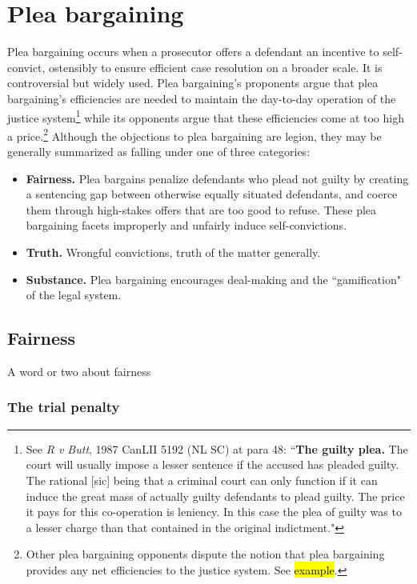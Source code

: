 \section{Plea bargaining}

Plea bargaining occurs when a prosecutor offers a defendant an incentive to self-convict, ostensibly to ensure efficient case resolution on a broader scale. It is controversial but widely used. Plea bargaining's proponents argue that plea bargaining's efficiencies are needed to maintain the day-to-day operation of the justice system\footnote{See \textit{R v Butt}, 1987 CanLII 5192 (NL SC) at para 48: ``\textbf{The guilty plea.} The court will usually impose a lesser sentence if the accused has pleaded guilty. The rational [sic] being that a criminal court can only function if it can induce the great mass of actually guilty defendants to plead guilty. The price it pays for this co-operation is leniency. In this case the plea of guilty was to a lesser charge than that contained in the original indictment."} while its opponents argue that these efficiencies come at too high a price.\footnote{Other plea bargaining opponents dispute the notion that plea bargaining provides any net efficiencies to the justice system. See \hl{example}.} Although the objections to plea bargaining are legion, they may be generally summarized as falling under one of three categories:

\begin{itemize}
    \item \textbf{Fairness.} Plea bargains penalize defendants who plead not guilty by creating a sentencing gap between otherwise equally situated defendants, and coerce them through high-stakes offers that are too good to refuse. These plea bargaining facets improperly and unfairly induce self-convictions.
    \item \textbf{Truth.} Wrongful convictions, truth of the matter generally. 
    \item \textbf{Substance.} Plea bargaining encourages deal-making and the ``gamification" of the legal system. 
\end{itemize}



\subsection{Fairness}

A word or two about fairness

\subsubsection{The trial penalty}

